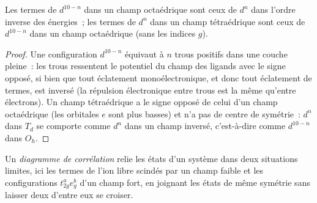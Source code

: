 \begin{proposition}\label{prop:b3:complex-spectra-magnetism:hole}
Les termes de $d^{10-n}$ dans un champ octaédrique sont ceux de $d^n$ dans
l'ordre inverse des énergies~; les termes de $d^n$ dans un champ
tétraédrique sont ceux de $d^{10-n}$ dans un champ octaédrique (sans les
indices $g$).
\end{proposition}

\begin{proof}
Une configuration $d^{10-n}$ équivaut à $n$ trous positifs dans une couche
pleine~: les trous ressentent le potentiel du champ des ligands avec le
signe opposé, si bien que tout éclatement monoélectronique, et donc tout
éclatement de termes, est inversé (la répulsion électronique entre trous
est la même qu'entre électrons). Un champ tétraédrique a le signe opposé
de celui d'un champ octaédrique (les orbitales $e$ sont plus basses) et n'a
pas de centre de symétrie~: $d^n$ dans $T_d$ se comporte comme $d^n$ dans
un champ inversé, c'est-à-dire comme $d^{10-n}$ dans $O_h$.
\end{proof}

\begin{definition}\label{def:b3:complex-spectra-magnetism:correlation}
Un \emph{diagramme de corrélation} relie les états
d'un système dans deux situations limites, ici les termes de l'ion libre
scindés par un champ faible et les configurations $t_{2g}^ae_g^b$ d'un champ
fort, en joignant les états de même symétrie sans laisser deux d'entre eux
se croiser.
\end{definition}

